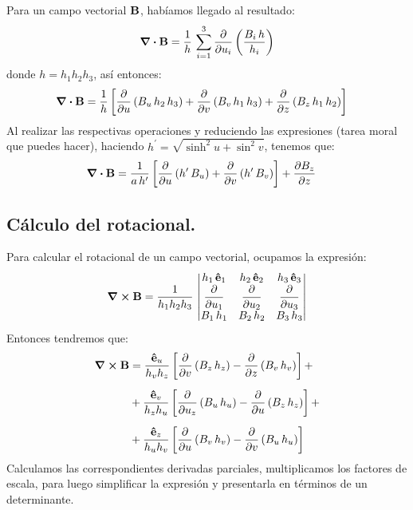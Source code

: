 \documentclass[12pt]{article}
\numberwithin{equation}{section}
\begin{document}
Para un campo vectorial $\vb{B}$, habíamos llegado al resultado:
\begin{align*}
\div{\vb{B}} = \dfrac{1}{h} \, \sum_{i=1}^{3} \pdv{u_{i}} \left( \dfrac{B_{i} \, h}{h_{i}} \right)
\end{align*}
donde $h = h_{1} h_{2} h_{3}$, así entonces:
\begin{align*}
\div{\vb{B}} &= \dfrac{1}{h} \left[ \pdv{u} \left( B_{u} \, h_{2} \, h_{3} \right) + \pdv{v} \left( B_{v} \, h_{1} \, h_{3} \right) + \pdv{z} \left( B_{z} \, h_{1} \, h_{2} \right) \right]
\end{align*}
Al realizar las respectivas operaciones y reduciendo las expresiones (tarea moral que puedes hacer), haciendo $h^{\prime} = \sqrt{\sinh^{2} u + \sin^{2} v}$, tenemos que:
\begin{align*}
\div{\vb{B}} &= \dfrac{1}{a \, h^{\prime}} \left[ \pdv{u} \left( h^{\prime} \, B_{u} \right) + \pdv{v} \left( h^{\prime} \, B_{v} \right) \right] + \pdv{B_{z}}{z}
\end{align*}

\subsection{Cálculo del rotacional.}

Para calcular el rotacional de un campo vectorial, ocupamos la expresión:
\begin{align*}
\curl{\vb{B}} = \dfrac{1}{h_{1} h_{2} h_{3}} \, \mdet{
h_{1} \, \vu{e}_{1} & h_{2} \, \vu{e}_{2} & h_{3} \, \vu{e}_{3} \\
\displaystyle \pdv{u_{1}} & \displaystyle \pdv{u_{2}} & \displaystyle \pdv{u_{3}} \\
B_{1} \, h_{1} & B_{2} \, h_{2} & B_{3} \, h_{3}
}
\end{align*}
Entonces tendremos que:
\begin{align*}
\curl{\vb{B}} &= \dfrac{\vu{e}_{u}}{h_{v} h_{z}} \left[ \displaystyle \pdv{v} \left( B_{z} \, h_{z} \right) - \pdv{z} \left( B_{v} \, h_{v} \right) \right] + \\[0.5em]
&+ \dfrac{\vu{e}_{v}}{h_{z} h_{u}} \left[ \displaystyle \pdv{u_{z}} \left( B_{u} \, h_{u} \right) - \pdv{u} \left( B_{z} \, h_{z} \right) \right] + \\[0.5em]
&+ \dfrac{\vu{e}_{z}}{h_{u} h_{v}} \left[ \displaystyle \pdv{u} \left( B_{v} \, h_{v} \right) - \pdv{v} \left( B_{u} \, h_{u} \right) \right]
\end{align*}
Calculamos las correspondientes derivadas parciales, multiplicamos los factores de escala, para luego  simplificar la expresión y presentarla en términos de un determinante.
\end{document}
